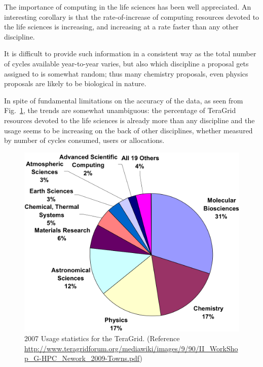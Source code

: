 \documentclass{sig-alternate}
\begin{document}
The importance of computing in the life sciences has been well
appreciated. An interesting corollary is that the rate-of-increase of
computing resources devoted to the life sciences is increasing, and
increasing at a rate faster than any other discipline. 

It is difficult to provide such information in a consistent way
as the total number of cycles available year-to-year varies, but
also which discipline a proposal gets assigned to is somewhat
random; thus many chemistry proposals, even physics proposals
are likely to be biological in nature. 

In spite of fundamental limitations on the accuracy of the data,
as seen from Fig.~\ref{tg2007}, the trends are somewhat
unambiguous: the percentage of TeraGrid resources devoted
to the life sciences is already more than any discipline and
the usage seems to be increasing on the back of other disciplines, 
whether measured by number of cycles consumed, users or 
allocations.



\begin{figure}
 \centering
\includegraphics[scale=0.40]{figures/teragrid-discipline07}
\caption{\small 2007 Usage statistics for the TeraGrid.  (Reference
  \url{http://www.teragridforum.org/mediawiki/images/9/90/II_WorkShop_G-HPC_Nework_2009-Towns.pdf})}
  \label{tg2007}
\end{figure}
\end{document}
